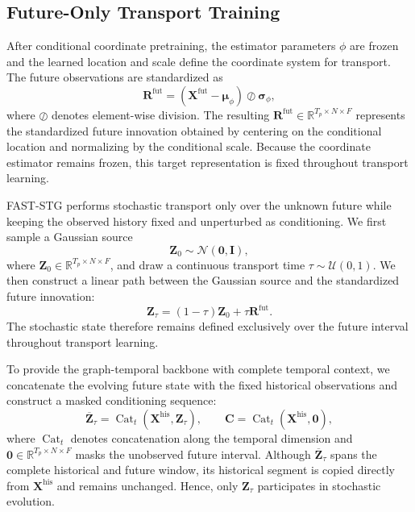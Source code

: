 \documentclass[sigconf, anonymous, review]{acmart}
\begin{document}
\subsection{Future-Only Transport Training}
\label{sec:future_transport_training}

After conditional coordinate pretraining, the estimator parameters
$\phi$ are frozen and the learned location and scale define the
coordinate system for transport. The future observations are
standardized as
%
\begin{equation}
\mathbf{R}^{\mathrm{fut}}
=
\left(
\mathbf{X}^{\mathrm{fut}}
-
\boldsymbol{\mu}_{\phi}
\right)
\oslash
\boldsymbol{\sigma}_{\phi},
\label{eq:standardized_innovation}
\end{equation}
%
where $\oslash$ denotes element-wise division. The resulting
$\mathbf{R}^{\mathrm{fut}}
\in\mathbb{R}^{T_p\times N\times F}$
represents the standardized future innovation obtained by centering
on the conditional location and normalizing by the conditional scale. Because the coordinate estimator remains frozen, this target
representation is fixed throughout transport learning.

FAST-STG performs stochastic transport only over the unknown future
while keeping the observed history fixed and unperturbed as conditioning. We first
sample a Gaussian source
%
\begin{equation}
\mathbf{Z}_{0}
\sim
\mathcal{N}
\left(
\mathbf{0},
\mathbf{I}
\right),
\label{eq:transport_source}
\end{equation}
%
where
$\mathbf{Z}_{0}\in\mathbb{R}^{T_p\times N\times F}$,
and draw a continuous transport time
$\tau\sim\mathcal{U}(0,1)$. We then construct a linear path between the
Gaussian source and the standardized future innovation:
%
\begin{equation}
\mathbf{Z}_{\tau}
=
(1-\tau)\mathbf{Z}_{0}
+
\tau\mathbf{R}^{\mathrm{fut}}.
\label{eq:linear_transport_path}
\end{equation}
%
The stochastic state therefore remains defined exclusively over the
future interval throughout transport learning.

To provide the graph-temporal backbone with complete temporal context,
we concatenate the evolving future state with the fixed historical
observations and construct a masked conditioning sequence:
%
\begin{equation}
\overline{\mathbf{Z}}_{\tau}
=
\operatorname{Cat}_{t}
\left(
\mathbf{X}^{\mathrm{his}},
\mathbf{Z}_{\tau}
\right),
\qquad
\mathbf{C}
=
\operatorname{Cat}_{t}
\left(
\mathbf{X}^{\mathrm{his}},
\mathbf{0}
\right),
\label{eq:future_only_inputs}
\end{equation}
%
where $\operatorname{Cat}_{t}$ denotes concatenation along the temporal
dimension and
$\mathbf{0}\in\mathbb{R}^{T_p\times N\times F}$
masks the unobserved future interval. Although
$\overline{\mathbf{Z}}_{\tau}$ spans the complete historical and future
window, its historical segment is copied directly from
$\mathbf{X}^{\mathrm{his}}$ and remains unchanged. Hence, only
$\mathbf{Z}_{\tau}$ participates in stochastic evolution.
\end{document}
